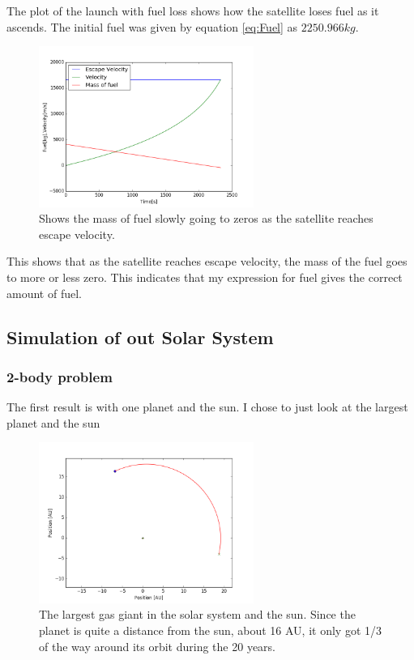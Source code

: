 \documentclass[a4paper, 10pt]{article}
\begin{document}
The plot of the launch with fuel loss shows how the satellite loses fuel as it ascends. The initial fuel was given by equation \ref{eq:Fuel} as $2250.966 kg$.


\begin{figure}[H]
\begin{center}
\includegraphics[width = 70mm]{part1launchVarMass.png}
\caption{Shows the mass of fuel slowly going to zeros as the satellite reaches escape velocity.}
\end{center}
\end{figure}

This shows that as the satellite reaches escape velocity, the mass of the fuel goes to more or less zero. This indicates that my expression for fuel gives the correct amount of fuel.

\subsection{Simulation of out Solar System}
\subsubsection{2-body problem}

The first result is with one planet and the sun. I chose to just look at the largest planet and the sun


\begin{figure}[H]
\begin{center}
\includegraphics[width = 70mm]{part2onePlanet.png}
\caption{The largest gas giant in the solar system and the sun. Since the planet is quite a distance from the sun, about 16 AU, it only got 1/3 of the way around its orbit during the 20 years.}
\end{center}
\end{figure}
\end{document}
